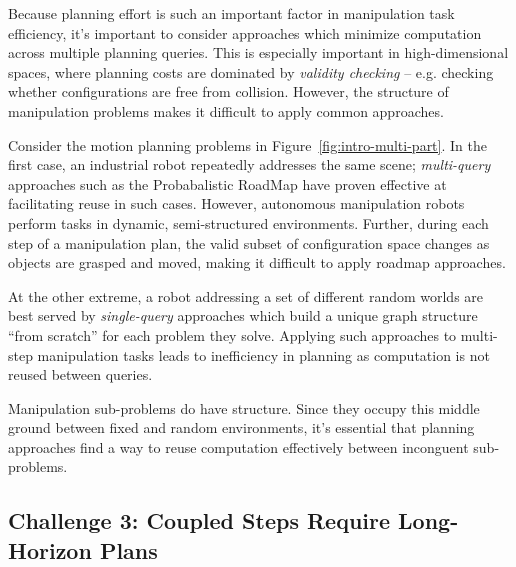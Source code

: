 Because planning effort is such an important factor in
manipulation task efficiency,
it's important to consider approaches which minimize computation
across multiple planning queries.
This is especially important in high-dimensional spaces,
where planning costs are dominated by \emph{validity checking} --
e.g. checking whether configurations are free from collision.
However, the structure of manipulation problems
makes it difficult to apply common approaches.

Consider the motion planning problems in
Figure~\ref{fig:intro-multi-part}.
In the first case,
an industrial robot repeatedly addresses the same scene;
\emph{multi-query} approaches such as the
Probabalistic RoadMap\cite{kavrakietal1996prm}
have proven effective at facilitating reuse in such cases.
However,
autonomous manipulation robots perform tasks
in dynamic, semi-structured environments.
Further,
during each step of a manipulation plan,
the valid subset of configuration space changes
as objects are grasped and moved,
making it difficult to apply roadmap approaches.

At the other extreme,
a robot addressing a set of different random worlds
are best served by \emph{single-query} approaches
which build a unique graph structure ``from scratch''
for each problem they solve.
Applying such approaches to multi-step manipulation tasks
leads to inefficiency in planning
as computation is not reused between queries.

Manipulation sub-problems do have structure.
Since they occupy this middle ground between
fixed and random environments,
it's essential that planning approaches
find a way to reuse computation effectively
between inconguent sub-problems.

\subsection*{Challenge 3: Coupled Steps Require Long-Horizon Plans}

